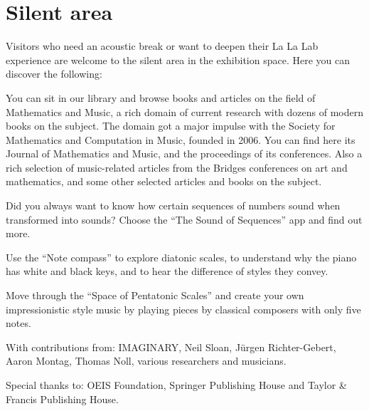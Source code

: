 \section{Silent area}
Visitors who need an acoustic break or want to deepen their La La Lab experience are welcome to the silent area in the exhibition space. Here you can discover the following:

You can sit in our library and browse books and articles on the field of Mathematics and Music, a rich domain of current research with dozens of modern books on the subject. The domain got a major impulse with the Society for Mathematics and Computation in Music, founded in 2006. You can find here its Journal of Mathematics and Music, and the proceedings of its conferences. Also a rich selection of music-related articles from the Bridges conferences on art and mathematics, and some other selected articles and books on the subject.

Did you always want to know how certain sequences of numbers sound when transformed into sounds? Choose the ``The Sound of Sequences'' app and find out more.

Use the ``Note compass'' to explore diatonic scales, to understand why the piano has white and black keys, and to hear the difference of styles they convey.

Move through the ``Space of Pentatonic Scales'' and create your own impressionistic style music by playing pieces by classical composers with only five notes.

\begin{sectcredits}
\item[With contributions from:] IMAGINARY, Neil Sloan, Jürgen Richter-Gebert, Aaron Montag, Thomas Noll, various researchers and musicians.
\item[Special thanks to:] OEIS Foundation, Springer Publishing House and Taylor \& Francis Publishing House.
\end{sectcredits}
